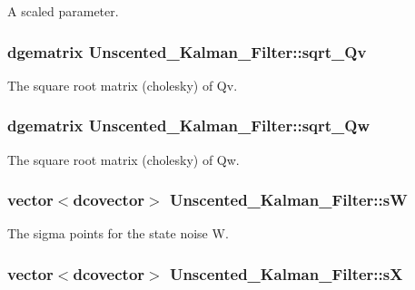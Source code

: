 A scaled parameter. 

\hypertarget{class_unscented___kalman___filter_633326bb2df6487da083ff8c7e09acdd}{
\subsubsection[{sqrt\_\-Qv}]{\setlength{\rightskip}{0pt plus 5cm}dgematrix {\bf Unscented\_\-Kalman\_\-Filter::sqrt\_\-Qv}}}
\label{class_unscented___kalman___filter_633326bb2df6487da083ff8c7e09acdd}


The square root matrix (cholesky) of Qv. 

\hypertarget{class_unscented___kalman___filter_ec03d2f57b006cad497c6bb30dae67c8}{
\subsubsection[{sqrt\_\-Qw}]{\setlength{\rightskip}{0pt plus 5cm}dgematrix {\bf Unscented\_\-Kalman\_\-Filter::sqrt\_\-Qw}}}
\label{class_unscented___kalman___filter_ec03d2f57b006cad497c6bb30dae67c8}


The square root matrix (cholesky) of Qw. 

\hypertarget{class_unscented___kalman___filter_3a77ce84c121d28608edd4a6f550aeae}{
\subsubsection[{sW}]{\setlength{\rightskip}{0pt plus 5cm}vector$<$dcovector$>$ {\bf Unscented\_\-Kalman\_\-Filter::sW}}}
\label{class_unscented___kalman___filter_3a77ce84c121d28608edd4a6f550aeae}


The sigma points for the state noise W. 

\hypertarget{class_unscented___kalman___filter_cd473b335bae84f2da4a18f412962127}{
\subsubsection[{sX}]{\setlength{\rightskip}{0pt plus 5cm}vector$<$dcovector$>$ {\bf Unscented\_\-Kalman\_\-Filter::sX}}}
\label{class_unscented___kalman___filter_cd473b335bae84f2da4a18f412962127}


